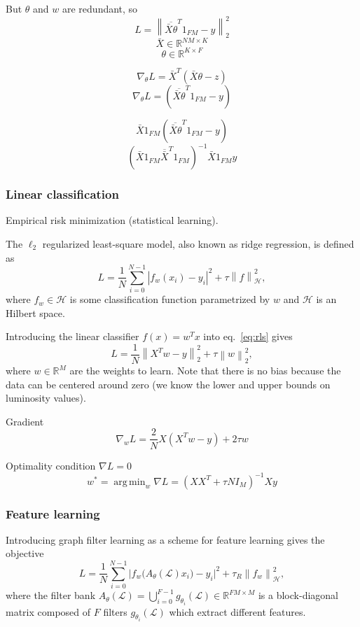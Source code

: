 \documentclass{article}
\DeclareMathOperator*{\argmin}{arg\,min}
\renewcommand{\L}{\mathcal{L}}
\renewcommand{\H}{\mathcal{H}}
\newcommand{\R}{\mathbb{R}}
\newcommand{\norm}[1]{\left\| #1 \right\|}
\begin{document}
But \(\theta\) and \(w\) are redundant, so
\[ L = \norm{\overline{\bar{X} \theta}^T 1_{FM} - y}_2^2 \]
\[ \bar{X} \in \R^{NM \times K} \] \[ \theta \in \R^{K \times F} \]

\[ \nabla_\theta L = \bar{X}^T (\bar{X} \theta - z) \]
\[ \nabla_\theta L = (\overline{\bar{X} \theta}^T 1_{FM} - y) \]

\[ \bar{X} 1_{FM} (\overline{\bar{X} \theta}^T 1_{FM} - y) \]
\[ (\bar{X} 1_{FM} \overline{\bar{X}}^T 1_{FM})^{-1} \bar{X} 1_{FM} y \]

\subsubsection{Linear classification}\label{linear-classification}

Empirical risk minimization (statistical learning).

The \(\ell_2\) regularized least-square model, also known as ridge
regression, is defined as \begin{equation} L =
\frac{1}{N} \sum_{i=0}^{N-1} |f_w(x_i) - y_i|^2 + \tau \norm{f}_\H^2,
\label{eq:rls}\end{equation} where \(f_w \in \H\) is some classification
function parametrized by \(w\) and \(\H\) is an Hilbert space.

Introducing the linear classifier \(f(x) = w^T x\) into eq.~\ref{eq:rls}
gives \[ L = \frac{1}{N} \norm{X^T w - y}_2^2  + \tau \norm{w}_2^2, \]
where \(w \in \R^M\) are the weights to learn. Note that there is no
bias because the data can be centered around zero (we know the lower and
upper bounds on luminosity values).

Gradient
\begin{equation} \nabla_w L = \frac{2}{N} X (X^T w - y) + 2 \tau w \label{eq:gradient_rls}\end{equation}

Optimality condition \(\nabla L = 0\)
\begin{equation} w^* = \argmin_w \nabla L =
\left(X X^T + \tau N I_M \right)^{-1} X y \label{eq:sol_rls}\end{equation}

\subsubsection{Feature learning}\label{feature-learning}

Introducing graph filter learning as a scheme for feature learning gives
the objective \[ L = \frac{1}{N} \sum_{i=0}^{N-1}
\Big| f_w \Big( A_\theta(\L) x_i \Big) - y_i \Big|^2 +
\tau_R \norm{f_w}_\H^2, \] where the filter bank
\(A_\theta(\L) = \bigcup_{i=0}^{F-1} g_{\theta_i}(\L) \in \R^{FM \times M}\)
is a block-diagonal matrix composed of \(F\) filters
\(g_{\theta_i}(\L)\) which extract different features.
\end{document}
